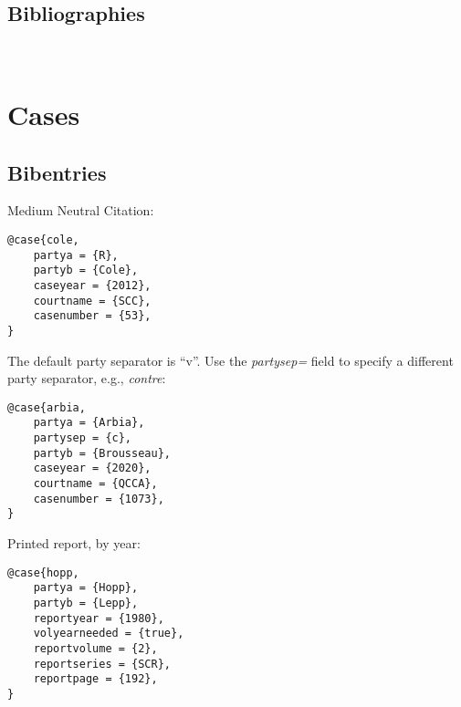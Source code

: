 \subsection{Bibliographies}

\newpage
\iftoggle{printlegtoc}{%
\let\oldtwocolumn\twocolumn
\renewcommand{\twocolumn}[1][]{#1}
\let\oldclearpage\clearpage
\renewcommand\clearpage{\relax}
\printindex[cases]
\printindex[legislation]
\iftoggle{printregulations}{\printindex[regulations]}{}
\renewcommand{\twocolumn}[1][]{\oldtwocolumn}
\renewcommand\clearpage{\oldclearpage}
}{}
\bigskip
\hfill{}\hfill\ %
\bigskip


\newpage


\section{Cases}
\subsection{Bibentries}

Medium Neutral Citation: \par\bigskip
\begin{verbatim}
@case{cole,
	partya = {R},
	partyb = {Cole},
	caseyear = {2012},
	courtname = {SCC},
	casenumber = {53},
}
\end{verbatim}

The default party separator is ``v''. Use the \textit{partysep=} field to specify a different party separator, e.g., \textit{contre}: \par\bigskip
 
\begin{verbatim}
@case{arbia,
	partya = {Arbia},
	partysep = {c},
	partyb = {Brousseau},
	caseyear = {2020},
	courtname = {QCCA},
	casenumber = {1073},
}
\end{verbatim}




Printed report, by year: \par\bigskip
\begin{verbatim}
@case{hopp,
	partya = {Hopp},
	partyb = {Lepp},
	reportyear = {1980},
	volyearneeded = {true},
	reportvolume = {2},
	reportseries = {SCR},
	reportpage = {192},
}
\end{verbatim}

